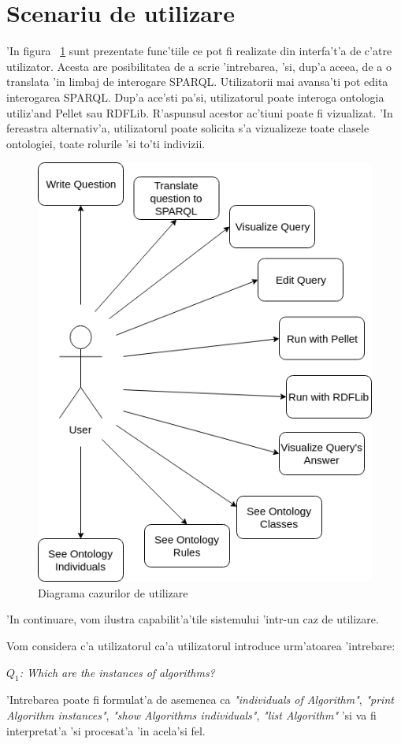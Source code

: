 \documentclass[12pt,a4paper,twoside]{report}
\begin{document}
\section{Scenariu de utilizare}

'In figura ~\ref{fig:usecases} sunt prezentate func'tiile ce pot fi realizate din interfa't'a de c'atre utilizator. Acesta are posibilitatea de a scrie 'intrebarea, 'si, dup'a aceea, de a o translata 'in limbaj de interogare SPARQL. Utilizatorii mai avansa'ti pot edita interogarea SPARQL. Dup'a ace'sti pa'si, utilizatorul poate interoga ontologia utiliz'and Pellet sau RDFLib.  R'aspunsul acestor ac'tiuni poate fi vizualizat. 'In fereastra alternativ'a, utilizatorul poate solicita s'a vizualizeze toate clasele ontologiei, toate rolurile 'si to'ti indivizii.


\begin{figure}
    \centering
    \includegraphics[width = 0.55 \linewidth]{img/use_case.png}
        \caption{Diagrama cazurilor de utilizare}
    \label{fig:usecases}
\end{figure}

'In continuare, vom ilustra capabilit'a'tile sistemului 'intr-un caz de utilizare.

Vom considera c'a utilizatorul ca'a utilizatorul introduce urm'atoarea 'intrebare:

\begin{center}
{\it $Q_1$: Which are the instances of algorithms?}
\end{center}

'Intrebarea poate fi formulat'a de asemenea ca {\it"individuals of Algorithm"},
       {\it "print Algorithm instances"},
       {\it "show Algorithms individuals"},
        {\it"list Algorithm"} 'si va fi interpretat'a 'si procesat'a 'in acela'si fel.
        
\end{document}
